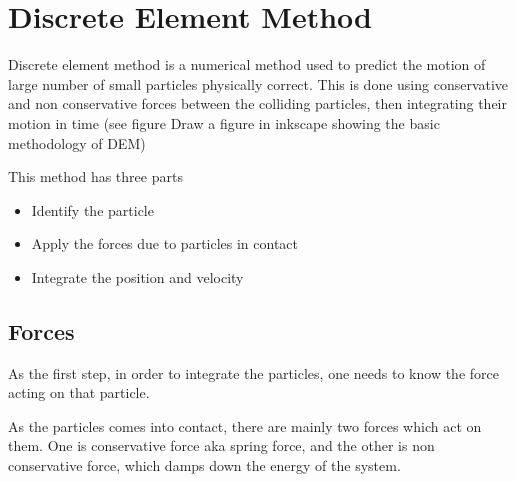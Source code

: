 \chapter{Discrete Element Method}


Discrete element method is a numerical method used to predict the
motion of large number of small particles physically correct. This is
done using conservative and non conservative forces between the
colliding particles, then integrating their motion in time (see figure
Draw a figure in inkscape showing the basic methodology of DEM)

This method has three parts
\begin{itemize}
\item Identify the particle
\item Apply the forces due to particles in contact
\item Integrate the position and velocity
\end{itemize}


\section{Forces}
\label{sec:forces}

As the first step, in order to integrate the particles, one needs to
know the force acting on that particle.

As the particles comes into contact, there are mainly two forces which act on them.
One is conservative force aka spring force, and the other is non conservative force, which damps
down the energy of the system.





